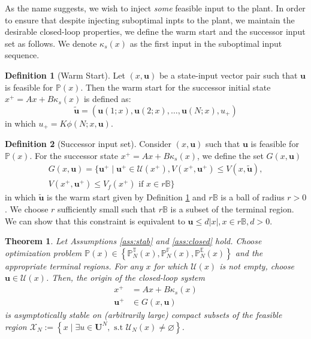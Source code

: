 \documentclass{article}
\newcommand{\bu}{\mathbf{u}}
\newcommand{\norm}[1]{\vert #1 \vert}
\newcommand{\set}[1]{\left\lbrace #1 \right\rbrace}
\newtheorem{theorem}{Theorem}
\theoremstyle{definition}
\newtheorem{definition}{Definition}
\begin{document}
As the name suggests, we wish to inject {\emph{some}} feasible input
to the plant. In order to ensure that despite injecting suboptimal
inpts to the plant, we maintain the desirable closed-loop properties,
we define the warm start and the successor input set as follows. We
denote $\kappa_s(x)$ as the first input in the suboptimal input
sequence.

\begin{definition}[Warm Start]
\label{def:warmstart}
Let $(x,\bu)$ be a state-input vector pair such that $\bu$ is feasible for $\mathbb{P}(x)$. Then the warm start for the successor initial state
$x^+ = Ax+B\kappa_s(x)$ is defined as:
\begin{equation*}
\tilde{\bu} = \left (\bu(1;x),\bu(2;x),\ldots,\bu(N;x),u_+\right)
\end{equation*}
in which  $u_+ = K\phi(N;x,\bu)$.
\end{definition}
\begin{definition}[Successor input set]
\label{def:G}
Consider $(x,\bu)$ such that $\bu$ is feasible for $\mathbb{P}(x)$. For the  successor state
$x^+ = Ax+B\kappa_s(x)$, we define the set $G(x,\bu)$
\begin{multline*}
G(x,\bu) = \lbrace \bu^+ \mid \bu^+ \in
\mathcal{U}(x^+), V(x^+,\bu^+)\leq V(x,\tilde{\bu}), \\
V(x^+,\bu^+) \leq V_f(x^+) \text{~if~} x\in r\mathbb{B} \rbrace
\end{multline*}
in which $\tilde{\bu}$ is the warm start given by Definition 
\ref{def:warmstart} and $r\mathbb{B}$ is a ball of radius $r>0$. We choose $r$ sufficiently small such that $r\mathbb{B}$ is a subset of the terminal region. We can show that this constraint is equivalent to  $\bu \leq d \norm{x}, x \in r\mathbb{B},d >0$.  
\end{definition}

\begin{theorem}
\label{thm:suboptimal}
Let Assumptions \ref{ass:stab} and \ref{ass:closed}
hold. Choose optimization problem $\mathbb{P}(x) \in \set{
  \mathbb{P}_N^{\mathbb{T}}(x), \mathbb{P}_N^{\mathbb{F}}(x),
  \mathbb{P}_N^{\mathbb{E}}(x)}$ and the appropriate terminal
regions. For any $x$ for which  $\mathcal{U}(x)$  is not empty, choose $\bu \in \mathcal{U}(x)$. Then, the origin of the closed-loop system
\begin{align*}
x^+ &= Ax+ B\kappa_s(x) \\
\bu^+ &\in G(x,\bu)
\end{align*}
is asymptotically stable on (arbitrarily large) compact  subsets of
the feasible region $\mathcal{X}_N :=\set{x\mid \exists u \in
  \mathbf{U}^N, \text{~s.t~} \mathcal{U}_N(x) \neq \varnothing}$. 
\end{theorem}
\end{document}
